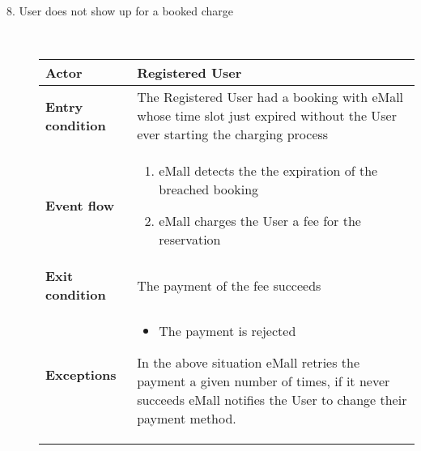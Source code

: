 \documentclass[11pt]{article}
\begin{document}
\begin{description}
    \item [8. User does not show up for a booked charge] \hfill \\
    \begin{table}[H]
        \centering
        \setlength{\tabcolsep}{18pt}
        \renewcommand{\arraystretch}{1.4}
        \begin{tabularx}{\textwidth}{|>{\hsize=0.5\hsize}X|>{\hsize=1.5\hsize}X|}
            \hline
            \textbf{Actor} & Registered User \\
            \hline
            \textbf{Entry condition} & The Registered User had a booking with eMall whose time slot just expired without the User ever starting the charging process \\
            \hline
            \textbf{Event flow} & 
                \begin{minipage}[t]{\hsize}
                \begin{enumerate}[topsep=0pt, leftmargin=*]
                    \item eMall detects the the expiration of the breached booking
                    \item eMall charges the User a fee for the reservation
                \end{enumerate}
                \end{minipage}
                \vspace{6pt}
            \\
            \hline
            \textbf{Exit condition} & The payment of the fee succeeds \\
            \hline
            \textbf{Exceptions} & 
                \begin{minipage}[t]{\hsize}
                \vspace{0pt}
                \begin{itemize}[topsep=0pt, leftmargin=*]
                    \item The payment is rejected
                \end{itemize}
                \vspace{8pt}
                \end{minipage}
                In the above situation eMall retries the payment a given number of times, if it never succeeds eMall notifies the User to change their payment method.
                \vspace{6pt}
            \\
            \hline
        \end{tabularx}
    \end{table}
    

\end{description}
\end{document}
